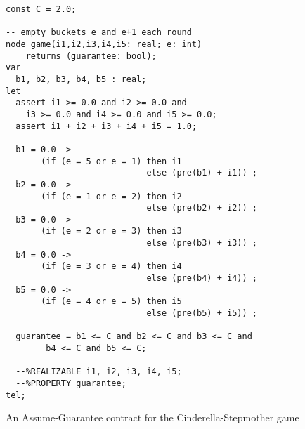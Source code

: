 \begin{figure}[!t]
\centering
 \begin{Verbatim}[fontsize=\footnotesize]
const C = 2.0;

-- empty buckets e and e+1 each round
node game(i1,i2,i3,i4,i5: real; e: int)
	returns (guarantee: bool);
var
  b1, b2, b3, b4, b5 : real;
let
  assert i1 >= 0.0 and i2 >= 0.0 and
 	i3 >= 0.0 and i4 >= 0.0 and i5 >= 0.0;
  assert i1 + i2 + i3 + i4 + i5 = 1.0;

  b1 = 0.0 ->
       (if (e = 5 or e = 1) then i1
                            else (pre(b1) + i1)) ;
  b2 = 0.0 ->
       (if (e = 1 or e = 2) then i2
                            else (pre(b2) + i2)) ;
  b3 = 0.0 ->
       (if (e = 2 or e = 3) then i3
                            else (pre(b3) + i3)) ;
  b4 = 0.0 ->
       (if (e = 3 or e = 4) then i4
                            else (pre(b4) + i4)) ;
  b5 = 0.0 ->
       (if (e = 4 or e = 5) then i5
                            else (pre(b5) + i5)) ;

  guarantee = b1 <= C and b2 <= C and b3 <= C and
  	    b4 <= C and b5 <= C;

  --%REALIZABLE i1, i2, i3, i4, i5;
  --%PROPERTY guarantee;
tel;
 \end{Verbatim}
\caption{An Assume-Guarantee contract for the Cinderella-Stepmother game}
\label{fg:cind}
\end{figure}


